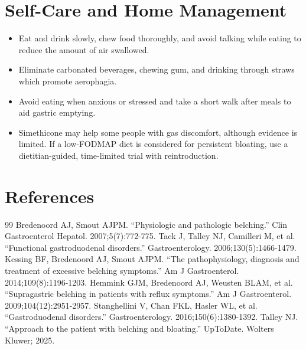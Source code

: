 \section*{Self-Care and Home Management}
\begin{itemize}
 \item Eat and drink slowly, chew food thoroughly, and avoid talking while eating to reduce the amount of air swallowed.
 \item Eliminate carbonated beverages, chewing gum, and drinking through straws which promote aerophagia.
 \item Avoid eating when anxious or stressed and take a short walk after meals to aid gastric emptying.
 \item Simethicone may help some people with gas discomfort, although evidence is limited. If a low-FODMAP diet is considered for persistent bloating, use a dietitian-guided, time-limited trial with reintroduction.
\end{itemize}

\section*{References}
\begin{thebibliography}{99}
 Bredenoord AJ, Smout AJPM. ``Physiologic and pathologic belching.'' Clin Gastroenterol Hepatol. 2007;5(7):772-775.
 Tack J, Talley NJ, Camilleri M, et al. ``Functional gastroduodenal disorders.'' Gastroenterology. 2006;130(5):1466-1479.
 Kessing BF, Bredenoord AJ, Smout AJPM. ``The pathophysiology, diagnosis and treatment of excessive belching symptoms.'' Am J Gastroenterol. 2014;109(8):1196-1203.
 Hemmink GJM, Bredenoord AJ, Weusten BLAM, et al. ``Supragastric belching in patients with reflux symptoms.'' Am J Gastroenterol. 2009;104(12):2951-2957.
 Stanghellini V, Chan FKL, Hasler WL, et al. ``Gastroduodenal disorders.'' Gastroenterology. 2016;150(6):1380-1392.
 Talley NJ. ``Approach to the patient with belching and bloating.'' UpToDate. Wolters Kluwer; 2025.
\end{thebibliography}
